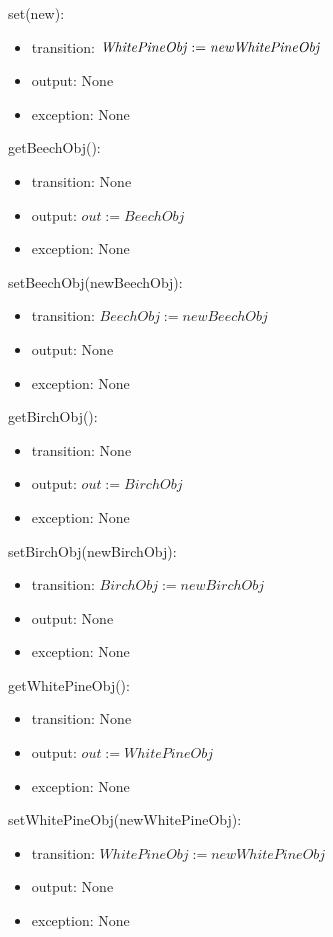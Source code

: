 \documentclass[12pt, titlepage]{article}
\begin{document}
\noindent set\attr(new\attr):
\begin{itemize}
\item transition: $\mathit{\attr := new\attr}$
\item output: None
\item exception: None
\end{itemize}


\renewcommand{\attr}{BeechObj}
\noindent get\attr():
\begin{itemize}
\item transition: None
\item output: $\mathit{out := \attr}$
\item exception: None
\end{itemize}

\noindent set\attr(new\attr):
\begin{itemize}
\item transition: $\mathit{\attr := new\attr}$
\item output: None
\item exception: None
\end{itemize}

\renewcommand{\attr}{BirchObj}
\noindent get\attr():
\begin{itemize}
\item transition: None
\item output: $\mathit{out := \attr}$
\item exception: None
\end{itemize}

\noindent set\attr(new\attr):
\begin{itemize}
\item transition: $\mathit{\attr := new\attr}$
\item output: None
\item exception: None
\end{itemize}

\newpage

\renewcommand{\attr}{WhitePineObj}
\noindent get\attr():
\begin{itemize}
\item transition: None
\item output: $\mathit{out := \attr}$
\item exception: None
\end{itemize}

\noindent set\attr(new\attr):
\begin{itemize}
\item transition: $\mathit{\attr := new\attr}$
\item output: None
\item exception: None
\end{itemize}
\end{document}

